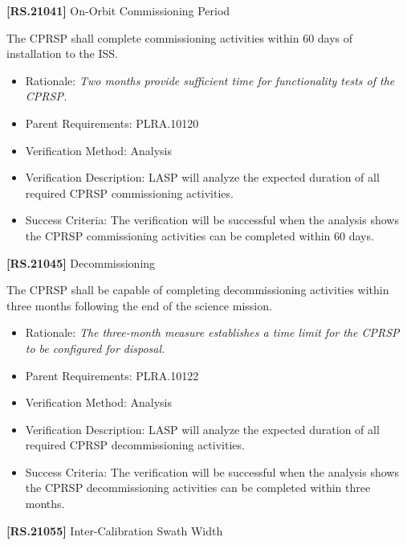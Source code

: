 \documentclass[12pt,oneside,oldfontcommands]{memoir}
\begin{document}
\textbf{[RS.21041]} On-Orbit Commissioning Period

The \gls{CPRSP} shall complete commissioning activities within 60 days of installation to the \gls{ISS}.

\begin{itemize}
\item{} Rationale: \emph{Two months provide sufficient time for functionality tests of the CPRSP.}

\item{} Parent Requirements: PLRA.10120

\item{} Verification Method: Analysis

\item{} Verification Description: \gls{LASP} will analyze the expected duration of all required \gls{CPRSP} commissioning activities.

\item{} Success Criteria: The verification will be successful when the \gls{analysis} shows the \gls{CPRSP} commissioning activities can be completed within 60 days.

\end{itemize}

\textbf{[RS.21045]} Decommissioning

The \gls{CPRSP} shall be capable of completing decommissioning activities within three months following the end of the science mission.

\begin{itemize}
\item{} Rationale: \emph{The three-month measure establishes a time limit for the CPRSP to be configured for disposal.}

\item{} Parent Requirements: PLRA.10122

\item{} Verification Method: Analysis

\item{} Verification Description: \gls{LASP} will analyze the expected duration of all required \gls{CPRSP} decommissioning activities.

\item{} Success Criteria: The verification will be successful when the \gls{analysis} shows the \gls{CPRSP} decommissioning activities can be completed within three months.

\end{itemize}

\textbf{[RS.21055]} Inter-Calibration Swath Width
\end{document}
